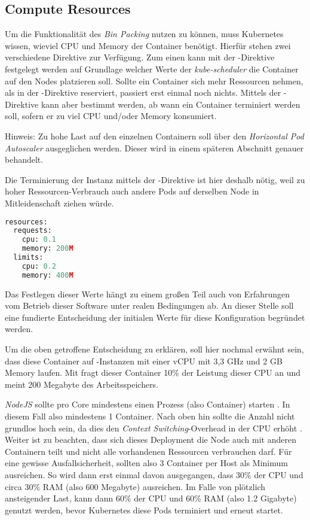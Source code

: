 \subsection{Compute Resources}
Um die Funktionalität des \emph{Bin Packing} nutzen zu können,
muss Kubernetes wissen,
wieviel CPU und Memory der Container benötigt.
Hierfür stehen zwei verschiedene Direktive zur Verfügung.
Zum einen kann mit der -Direktive festgelegt werden
auf Grundlage
welcher Werte der \emph{kube-scheduler} die Container auf den Nodes
platzieren soll.
Sollte ein Container sich mehr Ressourcen nehmen, als in der
-Direktive
reserviert, passiert erst einmal noch nichts.
Mittels der -Direktive kann aber bestimmt werden,
ab wann ein Container
terminiert werden soll, sofern er zu viel CPU und/oder Memory konsumiert.
\begin{tcolorbox}
Hinweis: Zu hohe Last auf den einzelnen Containern soll über den
\emph{Horizontal Pod Autoscaler} ausgeglichen werden. Dieser wird in einem
späteren Abschnitt genauer behandelt.
\end{tcolorbox}
Die Terminierung der
Instanz mittels der -Direktive ist hier deshalb nötig, weil zu
hoher Ressourcen-Verbrauch auch andere Pods auf derselben Node in
Mitleidenschaft ziehen würde.

\begin{lstlisting}[language=Python,numbers=none]
resources:
  requests:
    cpu: 0.1
    memory: 200M
  limits:
    cpu: 0.2
    memory: 400M
\end{lstlisting}

Das Festlegen dieser Werte hängt zu einem großen Teil auch von Erfahrungen
vom Betrieb dieser Software unter realen Bedingungen ab.
An dieser Stelle soll eine
fundierte Entscheidung der initialen Werte für diese Konfiguration
begründet werden.

Um die oben getroffene Entscheidung zu erklären, soll hier nochmal erwähnt sein,
dass diese Container auf -Instanzen mit einer vCPU mit 3,3 GHz
und 2 GB Memory laufen. Mit  fragt dieser Container 10\% der Leistung
dieser CPU an und  meint 200 Megabyte des Arbeitsspeichers.

\emph{NodeJS} sollte pro Core mindestens einen Prozess (also Container) starten \cite{multicodenodejs}.
In diesem Fall also mindestens 1 Container.
Nach oben hin sollte die Anzahl nicht grundlos hoch sein, da dies den
\emph{Context Switching}-Overhead in der CPU erhöht \cite{nodejs}.
Weiter ist zu beachten, dass sich dieses Deployment die Node auch mit
anderen Containern
teilt und nicht alle vorhandenen Ressourcen verbrauchen darf.
Für eine gewisse Ausfallsicherheit, sollten also 3 Container per Host als Minimum
ausreichen. So wird dann erst einmal davon ausgegangen, dass 30\% der CPU und
circa 30\% RAM (also 600 Megabyte) ausreichen. Im Falle von plötzlich ansteigender
Last, kann dann 60\% der CPU und 60\% RAM (also 1.2 Gigabyte) genutzt werden,
bevor Kubernetes diese Pods terminiert und erneut startet.

